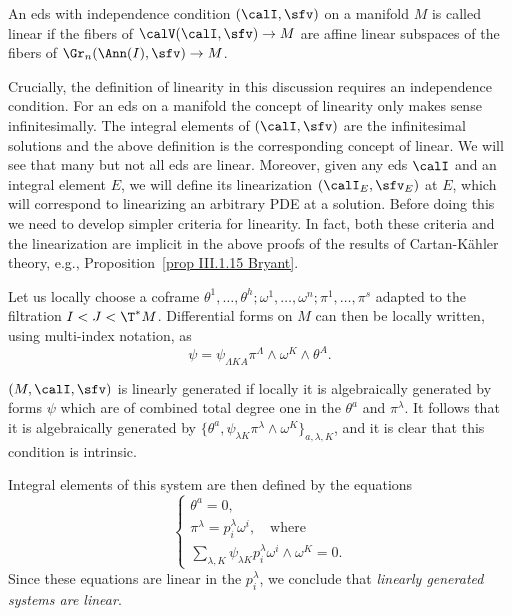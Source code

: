 \begin{defn}
    An \gls{eds} with independence condition $(\calI,\sfv)$ on a manifold $M$ is called linear if the fibers of $\calV(\calI,\sfv)\to M$ are affine linear subspaces of the fibers of $\Gr_n(\Ann(I),\sfv)\to M$.
\end{defn}

Crucially, the definition of linearity in this discussion requires an independence condition. For an \gls{eds} on a manifold the concept of linearity only makes sense infinitesimally. The integral elements of $(\calI,\sfv)$ are the infinitesimal solutions and the above definition is the corresponding concept of linear. We will see that many but not all \gls{eds} are linear. Moreover, given any \gls{eds} $\calI$ and an integral element $E$, we will define its linearization $(\calI_E,\sfv_E)$ at $E$, which will correspond to linearizing an arbitrary PDE at a solution. Before doing this we need to develop simpler criteria for linearity. In fact, both these criteria and the linearization are implicit in the above proofs of the results of Cartan-K\"ahler theory, e.g., Proposition~\ref{prop III.1.15 Bryant}.


Let us locally choose a coframe $\theta^1,\ldots,\theta^h;\omega^1,\ldots,\omega^n;\pi^1,\ldots,\pi^s$ adapted to the filtration $I<J<\T^\ast M$. Differential forms on $M$ can then be locally written, using multi-index notation, as 
\[\psi=\psi_{\Lambda KA}\pi^\Lambda\wedge\omega^K\wedge\theta^A.\label{eq iii.14 Bryant}\]

\begin{defn}
    $(M,\calI,\sfv)$ is linearly generated if locally it is algebraically generated by forms $\psi$ which are of combined total degree one in the $\theta^a$ and $\pi^\lambda$. It follows that it is algebraically generated by $\{\theta^a,\psi_{\lambda K}\pi^\lambda\wedge\omega^K\}_{a,\lambda,K}$, and it is clear that this condition is intrinsic.
\end{defn}

Integral elements of this system are then defined by the equations 
\[\left\{
    \begin{array}{l}
        \theta^a=0,\\
        \pi^\lambda=p^\lambda_i\omega^i,\quad \text{where}\\
        \sum_{\lambda,K}\psi_{\lambda K}p^\lambda_i \omega^i\wedge\omega^K=0.
    \end{array}
\right.\]
Since these equations are linear in the $p_i^\lambda$, we conclude that \emph{linearly generated systems are linear}.

